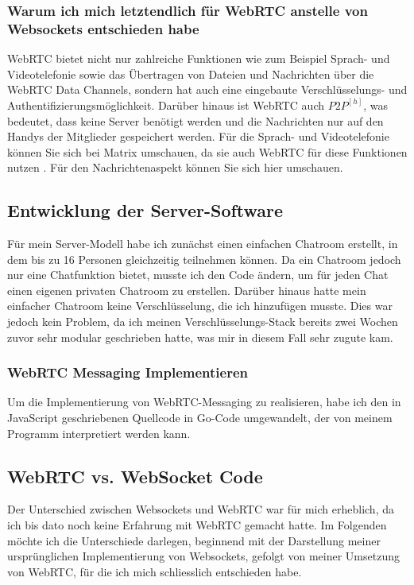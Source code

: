 \subsubsection{Warum ich mich letztendlich für WebRTC anstelle von Websockets entschieden habe}
WebRTC \cite{webrtc-website} bietet nicht nur zahlreiche Funktionen wie zum Beispiel Sprach- und Videotelefonie sowie das Übertragen von Dateien und Nachrichten über die WebRTC Data Channels, sondern hat auch eine eingebaute Verschlüsselungs- \cite{rfc8829} und Authentifizierungsmöglichkeit. Darüber hinaus ist WebRTC auch \hyperref[glo:p2p]{\(P2P^{[h]}\)}, was bedeutet, dass keine Server benötigt werden und die Nachrichten nur auf den Handys der Mitglieder gespeichert werden. Für die Sprach- und Videotelefonie können Sie sich bei Matrix umschauen, da sie auch WebRTC für diese Funktionen nutzen \cite{matrix-website}. Für den Nachrichtenaspekt können Sie sich hier \cite{webrtc-msg} umschauen. 
\subsection{Entwicklung der Server-Software}
Für mein Server-Modell habe ich zunächst einen einfachen Chatroom erstellt, in dem bis zu 16 Personen gleichzeitig teilnehmen können. Da ein Chatroom jedoch nur eine Chatfunktion bietet, musste ich den Code ändern, um für jeden Chat einen eigenen privaten Chatroom zu erstellen. Darüber hinaus hatte mein einfacher Chatroom keine Verschlüsselung, die ich hinzufügen musste. Dies war jedoch kein Problem, da ich meinen Verschlüsselungs-Stack bereits zwei Wochen zuvor sehr modular geschrieben hatte, was mir in diesem Fall sehr zugute kam.
\subsubsection{WebRTC Messaging Implementieren}
Um die Implementierung von WebRTC-Messaging zu realisieren, habe ich den in JavaScript geschriebenen Quellcode \cite{webrtc-messegaing-example-js} in Go-Code umgewandelt, der von meinem Programm interpretiert werden kann.
\subsection{WebRTC vs. WebSocket Code}
Der Unterschied zwischen Websockets und WebRTC war für mich erheblich, da ich bis dato noch keine Erfahrung mit WebRTC gemacht hatte. Im Folgenden möchte ich die Unterschiede darlegen, beginnend mit der Darstellung meiner ursprünglichen Implementierung von Websockets, gefolgt von meiner Umsetzung von WebRTC, für die ich mich schliesslich entschieden habe.
